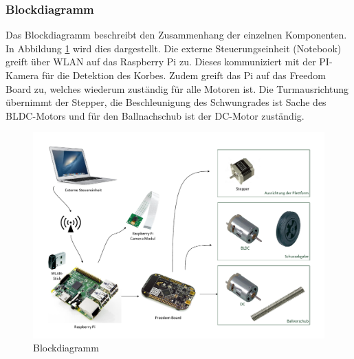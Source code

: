 \subsubsection{Blockdiagramm}
Das Blockdiagramm beschreibt den Zusammenhang der einzelnen Komponenten. In Abbildung \ref{fig:blockdiagramm} wird dies dargestellt. Die externe Steuerungseinheit (Notebook) greift über WLAN auf das Raspberry Pi zu. Dieses kommuniziert mit der PI-Kamera für die Detektion des Korbes. Zudem greift das Pi auf das Freedom Board zu, welches wiederum zuständig für alle Motoren ist. Die Turmausrichtung übernimmt der Stepper, die Beschleunigung des Schwungrades ist Sache des BLDC-Motors und für den Ballnachschub ist der DC-Motor zuständig.

\begin{figure}[h!]
\centering
\includegraphics[width=0.9\linewidth]{../../fig/blockdiagramm}
\caption{Blockdiagramm}
\label{fig:blockdiagramm}
\end{figure}
